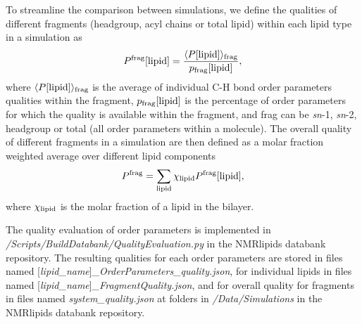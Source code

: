 \documentclass[fleqn,10pt]{wlscirep}
\begin{document}

To streamline the comparison between simulations, we define the qualities of different fragments (headgroup, acyl chains or total lipid) within each lipid type in a simulation as
\begin{equation}
    P^{\rm frag}[{\rm lipid}] = \frac{\langle P[{\rm lipid}]\rangle_{\rm frag}}{p_{\rm frag}[{\rm lipid}]},
\end{equation}
where $\langle P[{\rm lipid}]\rangle_{\rm frag}$ is the average of individual C-H bond order parameters qualities within the fragment, $p_{\rm frag}[{\rm lipid}]$ is the percentage of order parameters for which the quality is available within the fragment, and frag can be {\it sn}-1, {\it sn}-2, headgroup or total (all order parameters within a molecule). The overall quality of different fragments in a simulation are then defined as a molar fraction weighted average over different lipid components
\begin{equation}
    P^{\rm frag} = \sum_{\rm lipid} \chi_{\rm lipid} P^{\rm frag}[{\rm lipid}],
\end{equation}
where $\chi_{\rm lipid}$ is the molar fraction of a lipid in the bilayer.

The quality evaluation of order parameters is implemented in {\it /Scripts/BuildDatabank/QualityEvaluation.py} in the NMRlipids databank repository. The resulting qualities for each order parameters are stored in files named  [{\it lipid\_name}]{\it \_OrderParameters\_quality.json}, for individual lipids in files named [{\it lipid\_name}]{\it \_FragmentQuality.json}, and for overall quality for fragments in files named {\it system\_quality.json} at folders in {\it /Data/Simulations} in the NMRlipids databank repository. 
\end{document}

